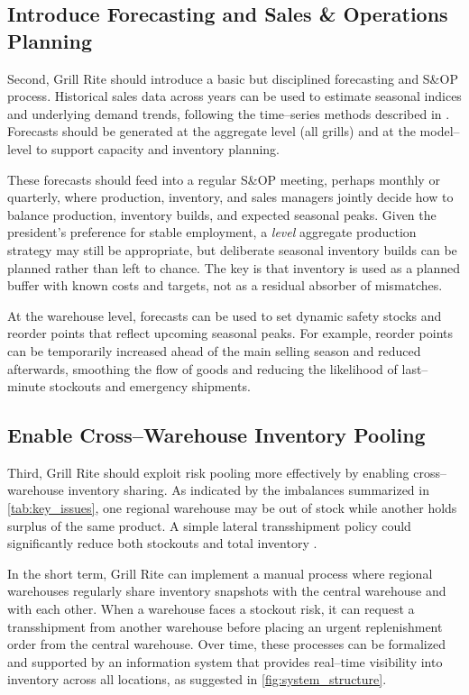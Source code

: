\documentclass[12pt,a4paper]{article}
\begin{document}
\subsection{Introduce Forecasting and Sales \& Operations Planning}

Second, Grill Rite should introduce a basic but disciplined forecasting and S\&OP process. Historical sales data across years can be used to estimate seasonal indices and underlying demand trends, following the time–series methods described in \citet{stevenson2017operations}. Forecasts should be generated at the aggregate level (all grills) and at the model–level to support capacity and inventory planning.

These forecasts should feed into a regular S\&OP meeting, perhaps monthly or quarterly, where production, inventory, and sales managers jointly decide how to balance production, inventory builds, and expected seasonal peaks. Given the president's preference for stable employment, a \emph{level} aggregate production strategy may still be appropriate, but deliberate seasonal inventory builds can be planned rather than left to chance. The key is that inventory is used as a planned buffer with known costs and targets, not as a residual absorber of mismatches.

At the warehouse level, forecasts can be used to set dynamic safety stocks and reorder points that reflect upcoming seasonal peaks. For example, reorder points can be temporarily increased ahead of the main selling season and reduced afterwards, smoothing the flow of goods and reducing the likelihood of last–minute stockouts and emergency shipments.

\subsection{Enable Cross–Warehouse Inventory Pooling}

Third, Grill Rite should exploit risk pooling more effectively by enabling cross–warehouse inventory sharing. As indicated by the imbalances summarized in \cref{tab:key_issues}, one regional warehouse may be out of stock while another holds surplus of the same product. A simple lateral transshipment policy could significantly reduce both stockouts and total inventory \citep{cachon2018matching}.

In the short term, Grill Rite can implement a manual process where regional warehouses regularly share inventory snapshots with the central warehouse and with each other. When a warehouse faces a stockout risk, it can request a transshipment from another warehouse before placing an urgent replenishment order from the central warehouse. Over time, these processes can be formalized and supported by an information system that provides real–time visibility into inventory across all locations, as suggested in \cref{fig:system_structure}.
\end{document}
